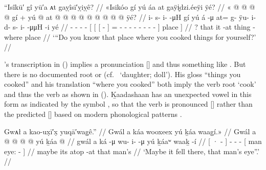 \ex\label{ex:100-78-place-where-you-cooked}%
%
\begingl
	\glpreamble	“Isîkū′ gî yū′a ᴀt gaỵîsī′ỵiỵê? //
	\glpreamble	«\!Isikóo gí yú áa at gaÿi̬dzi.éeÿi ÿé? //
	\gla	«\! @ {} @ {} @ {} @ {} gí +
		{} yú {} {}  @ {} {} 
			at @  @ {} @ {} @ {} @ {} @ {} @ {} @ {} @ {} {} ÿé? {} //
	\glb	\pqp{}i- s- i-  -μH gí
		{} yú {} {} á -μ {} 
			at= g- ÿu- i- d- s- i-  -μμH -i {} yé {} //
	\glc	\pqp{}- - -  - 
		{}[  {}[ {}[  - {}]
			= - - - - - - 
				 - - {}]
		place {}] //
	\gld	\pqp{} {} {} {} {} ?
		{} that {} {} it -at {}
			thing  {} {} {} {} {} {} {} -where {} place {} //
	\glft	‘“Do you know that place where you cooked things for yourself?’
		//
\endgl
\xe

\citeauthor{swanton:1909}’s transcription  in (\lastx) implies a pronunciation [] and thus something like .
But there is no documented root  or  (cf.\  ‘daughter; doll’).
His gloss “things you cooked” and his translation “where you cooked” both imply the verb root  ‘cook’ and thus the verb as shown in (\lastx).
Ḵaadashaan has an unexpected vowel in this form as indicated by the symbol , so that the verb is pronounced  [] rather than the predicted  [] based on modern phonological patterns \parencite[188]{leer:1991}.

\ex\label{ex:100-79-maybe-fell-there}%
%
\begingl
	\glpreamble	Gwᴀł a kao-ux̣ī′x̣ yuqā′wag̣ê.” //
	\glpreamble	Gwál a káa wooxeex yú ḵáa waag̱í.\!» //
	\gla	Gwál
		{} a  @ {} {}
		 @ {} @ {} @ {}
		{} yú ḵáa  @ {} {} //
	\glb	gwál
		{} a ká -μ {}
		wu- i-  -μ
		{} yú ḵáaʷ waaḵ -í {} //
	\glc	{}
		{}[ ·  - {}]
		- -  -
		{}[  man eye: - {}] //
	\gld	maybe
		{} its atop -at {}
		 {} {} {}
		{} that man’s  {} {} //
	\glft 	‘Maybe it fell there, that man’s eye”.’
		//
\endgl
\xe

